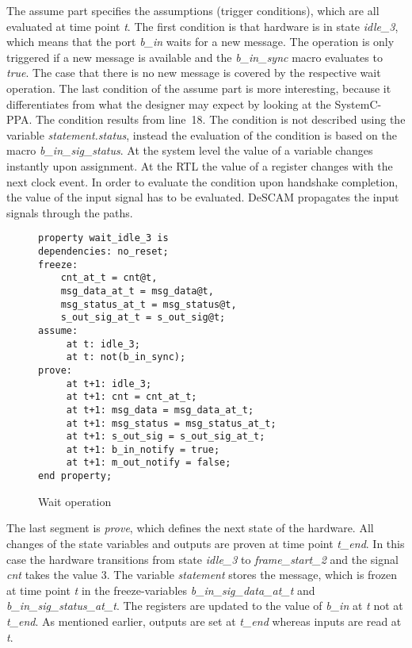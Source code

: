 The assume part specifies the assumptions (trigger conditions), which are all evaluated at time point \textit{t}. 
The first condition is that hardware is in state \textit{idle\_3}, which means that the port \textit{b\_in} waits for a new message.
The operation is only triggered if a new message is available and the \textit{b\_in\_sync} macro evaluates to \textit{true}. 
The case that there is no new message is covered by the respective wait operation.
The last condition of the assume part is more interesting, because it differentiates from what the designer may expect by looking at the SystemC-PPA. 
The condition results from line~18. The condition is not described using the variable \textit{statement.status}, instead the evaluation of the condition is based on the macro \textit{b\_in\_sig\_status}.
At the system level the value of a variable changes instantly upon assignment. 
At the RTL the value of a register changes with the next clock event. 
In order to evaluate the condition upon handshake completion, the value of the input signal has to be evaluated. 
DeSCAM propagates the input signals through the paths. 

\begin{wrapfigure}{r}{0.5\textwidth}
	\vspace{-20pt}
	\caption{Wait operation}
\begin{verbatim}
property wait_idle_3 is
dependencies: no_reset;
freeze:
	cnt_at_t = cnt@t,
	msg_data_at_t = msg_data@t,
	msg_status_at_t = msg_status@t,
	s_out_sig_at_t = s_out_sig@t;
assume:
	 at t: idle_3;
	 at t: not(b_in_sync);
prove:
	 at t+1: idle_3;
	 at t+1: cnt = cnt_at_t;
	 at t+1: msg_data = msg_data_at_t;
	 at t+1: msg_status = msg_status_at_t;
	 at t+1: s_out_sig = s_out_sig_at_t;
	 at t+1: b_in_notify = true;
	 at t+1: m_out_notify = false;
end property;
\end{verbatim}
\end{wrapfigure}

The last segment is \textit{prove}, which defines the next state of the hardware. 
All changes of the state variables and outputs are proven at time point \textit{t\_end}. 
In this case the hardware transitions from state \textit{idle\_3} to \textit{frame\_start\_2} and the signal \textit{cnt} takes the value 3.
The variable \textit{statement} stores the message, which is frozen at time point \textit{t} in the freeze-variables \textit{b\_in\_sig\_data\_at\_t} and \textit{b\_in\_sig\_status\_at\_t}.
The registers are updated to the value of \textit{b\_in} at \textit{t} not at \textit{t\_end}. 
As mentioned earlier, outputs are set at \textit{t\_end} whereas inputs are read at \textit{t}. 


